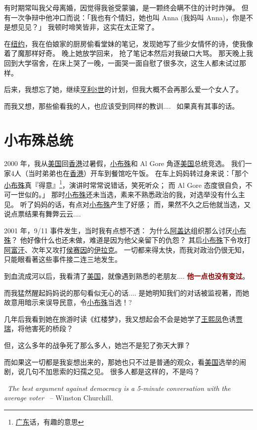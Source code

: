 \documentclass[12pt]{report}
\newcommand{\speechEn}[1]{\textrm{\textit{\ #1\ }}}
\renewcommand{\em}[1]{\textbf{\textcolor{DarkRed}{#1}}}
\begin{document}
有时期常叫我父母离婚，因觉得我爸受蒙骗，是一颗终会瞒不住的计时炸弹。 但有一次争辩中他冲口而说：「我也有个情妇，她也叫 Anna (我妈叫 Anna)，你是不是想见见？」 我顿时啼笑皆非，这实在太正常了。

在\uline{纽约}，我在伯娘家的厨房偷看堂妹的笔记，发现她写了些少女情怀的诗，使我像着了魔那样好奇。 晚上她放学回来， 抢了笔记本然后对我破口大骂。 那天晚上我回到大学宿舍，在床上哭了一晚，一面哭一面自慰了很多次，这生人都未试过那样。

后来，我想忘了她，继续\uline{亨利8世}的计划，但我大概不会再那么爱一个女人了。

而我又想，那些偷看我的人，也应该受到同样的教训....~ 如果真有其事的话。

\chapter{小布殊总统}

2000 年，我从\uline{美国}回\uline{香港}过暑假，\uline{小布殊}和 Al Gore 角逐\uline{美国}总统竞选。  我们一家4人（当时弟弟也在\uline{香港}）开车到餐馆吃午饭。  在车上妈妈转过身来说：「那个\uline{小布殊}真『得意』\footnote{\uline{广东}话，有趣的意思}，演讲时常常说错话，笑死听众； 而 Al Gore 态度很自负，不可一世似的。」  那时\uline{小布殊}还未当选，素来不熟悉政治的我，对选举没有什么主见。 听了妈妈的话，有点对\uline{小布殊}产生了好感； 而，果然不久之后他就当选，又说点票结果有舞弊云云....

2001 年，9/11 事件发生，当时我有点想不透： 为什么\uline{阿盖达}组织那么讨厌\uline{小布殊}？ 他好像什么也还未做，难道是因为他父亲留下的仇怨？ 其后\uline{小布殊}下令攻打\uline{阿富汗}、次年又攻打\uline{侯赛因}的\uline{伊拉克}。 一切都来得太快，而我对政治仍很无知，只能眼看著这些事件接二连三地发生。

到血流成河以后，我看清了\uline{美国}，就像遇到熟悉的老朋友.... \em{他一点也没有变过}。

而我猛然醒起妈妈说的那句看似无心的话.... 是她明知我们的对话被监视著，而她故意用暗示来误导民意，令\uline{小布殊}当选！?

几年后我看到她在旅游时读《红楼梦》，我又想起会不会是她学了\uline{王熙凤}色诱\uline{贾瑞}，将他害死的桥段？

但，这么多年的战争死了那么多人，她岂不是犯了弥天大罪？

而如果这一切都是我妄想出来的，那她也只不过是普通的观众，看\uline{美国}选举的闹剧，说几句不加思索的妇孺之见。 很多人都是这样的，不是吗？

\speechEn{The best argument against democracy is a 5-minute conversation with the average voter} -- Winston Churchill.
\end{document}
